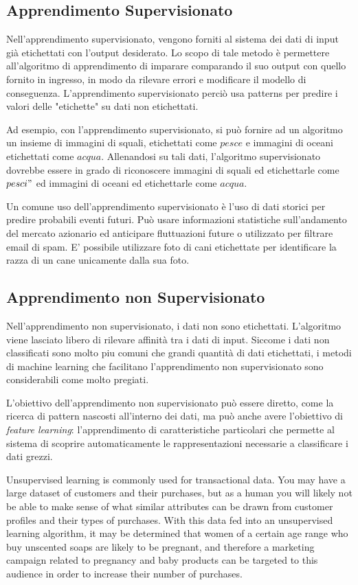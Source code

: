 \subsection{Apprendimento Supervisionato}
Nell'apprendimento supervisionato, vengono forniti al sistema dei dati di input già etichettati con l'output desiderato. Lo scopo di tale metodo è permettere all'algoritmo di apprendimento di imparare comparando il suo output con quello fornito in ingresso, in modo da rilevare errori e modificare il modello di conseguenza. L'apprendimento supervisionato perciò usa patterns per predire i valori delle "etichette" su dati non etichettati.

Ad esempio, con l'apprendimento supervisionato, si può fornire ad un algoritmo un insieme di immagini di squali, etichettati come $pesce$ e immagini di oceani etichettati come $acqua$. Allenandosi su tali dati, l'algoritmo supervisionato dovrebbe essere in grado di riconoscere immagini di squali ed etichettarle come $pesci"$ ed immagini di oceani ed etichettarle come $acqua$.

Un comune uso dell'apprendimento supervisionato è l'uso di dati storici per predire probabili eventi futuri. Può usare informazioni statistiche sull'andamento del mercato azionario ed anticipare fluttuazioni future o utilizzato per filtrare email di spam. E' possibile utilizzare foto di cani etichettate per identificare la razza di un cane unicamente dalla sua foto.

\subsection{Apprendimento non Supervisionato}
Nell'apprendimento non supervisionato, i dati non sono etichettati. L'algoritmo viene lasciato libero di rilevare affinità tra i dati di input. Siccome i dati non classificati sono molto piu comuni che grandi quantità di dati etichettati, i metodi di machine learning che facilitano l'apprendimento non supervisionato sono considerabili come molto pregiati.

L'obiettivo dell'apprendimento non supervisionato può essere diretto, come la ricerca di pattern nascosti all'interno dei dati, ma può anche avere l'obiettivo di \textit{feature learning}: l'apprendimento di caratteristiche particolari che permette al sistema di scoprire automaticamente le rappresentazioni necessarie a classificare i dati grezzi.

Unsupervised learning is commonly used for transactional data. You may have a large dataset of customers and their purchases, but as a human you will likely not be able to make sense of what similar attributes can be drawn from customer profiles and their types of purchases. With this data fed into an unsupervised learning algorithm, it may be determined that women of a certain age range who buy unscented soaps are likely to be pregnant, and therefore a marketing campaign related to pregnancy and baby products can be targeted to this audience in order to increase their number of purchases.

